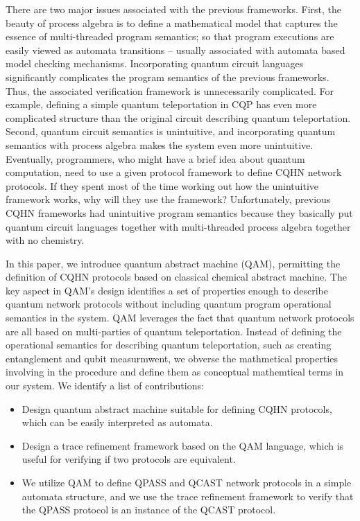 \documentclass[a4paper,UKenglish,cleveref, autoref, thm-restate]{lipics-v2021}
\begin{document}
There are two major issues associated with the previous frameworks.
First, the beauty of process algebra is to define a mathematical model that captures the essence of
multi-threaded program semantics; so that program executions are easily viewed as 
automata transitions -- usually associated with automata based model checking mechanisms.
Incorporating quantum circuit languages significantly complicates the program semantics of the previous frameworks. Thus, the associated verification framework is unnecessarily complicated.
For example, defining a simple quantum teleportation in CQP has even more complicated structure than the original circuit describing quantum teleportation.
Second, quantum circuit semantics is unintuitive, and incorporating quantum semantics with process algebra makes the system even more unintuitive.
Eventually, programmers, who might have a brief idea about quantum computation, need to use a given protocol framework to define CQHN network protocols. If they spent most of the time working out how the unintuitive framework works, why will they use the framework?
Unfortunately, previous CQHN frameworks had unintuitive program semantics because they basically put quantum circuit languages together with multi-threaded process algebra together with no chemistry. 

In this paper, we introduce quantum abstract machine (QAM), permitting the definition of CQHN protocols based on classical chemical abstract machine. The key aspect in QAM's design identifies a set of properties enough to describe quantum network protocols without including quantum program operational semantics in the system.
QAM leverages the fact that quantum network protocols are all based on multi-parties of quantum teleportation.
Instead of defining the operational semantics for describing quantum teleportation, such as creating entanglement and qubit measurmwent, we obverse the mathmetical properties involving in the procedure and define them as conceptual mathemtical terms in our system.
We identify a list of contributions:

\begin{itemize}
    \item Design quantum abstract machine suitable for defining CQHN protocols, which can be easily interpreted as automata.
    \item Design a trace refinement framework based on the QAM language, which is useful for verifying if two protocols are equivalent. 
    \item We utilize QAM to define QPASS and QCAST network protocols \cite{10.1145/3387514.3405853} in a simple automata structure, and we use the trace refinement framework to verify that the QPASS protocol is an instance of the QCAST protocol. 
\end{itemize}
\end{document}
